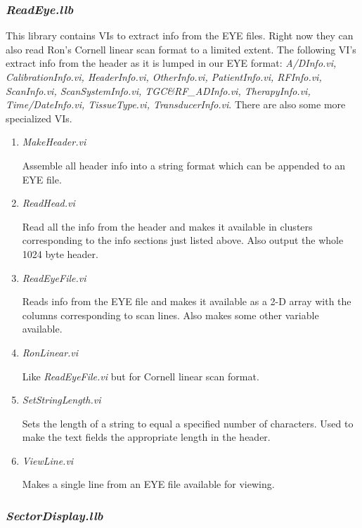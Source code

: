 \documentclass[10pt]{article}
\begin{document}
\subsubsection{{\it ReadEye.llb}}

This library contains VIs to extract info from the EYE files.
Right now they can also read Ron's Cornell linear scan format to a
limited extent. The following VI's extract info from the header as
it is lumped in our EYE format: {\it A/DInfo.vi,
CalibrationInfo.vi, HeaderInfo.vi, OtherInfo.vi, PatientInfo.vi,
RFInfo.vi, ScanInfo.vi, ScanSystemInfo.vi, TGC\&RF\_ADInfo.vi,
TherapyInfo.vi, Time/DateInfo.vi, TissueType.vi,
TransducerInfo.vi}. There are also some more specialized VIs.

\begin{enumerate}
\item {\it MakeHeader.vi}

Assemble all header info into a string format which can be
appended to an EYE file.

\item {\it ReadHead.vi}

Read all the info from the header and makes it available in
clusters corresponding to the info sections just listed above.
Also output the whole 1024 byte header.

\item {\it ReadEyeFile.vi}

Reads info from the EYE file and makes it available as a 2-D array
with the columns corresponding to scan lines. Also makes some
other variable available.

\item {\it RonLinear.vi}

Like {\it ReadEyeFile.vi} but for Cornell linear scan format.

\item {\it SetStringLength.vi}

Sets the length of a string to equal a specified number of
characters. Used to make the text fields the appropriate length in
the header.

\item {\it ViewLine.vi}

Makes a single line from an EYE file available for viewing.

\end{enumerate}

\subsubsection{{\it SectorDisplay.llb}}
\end{document}
